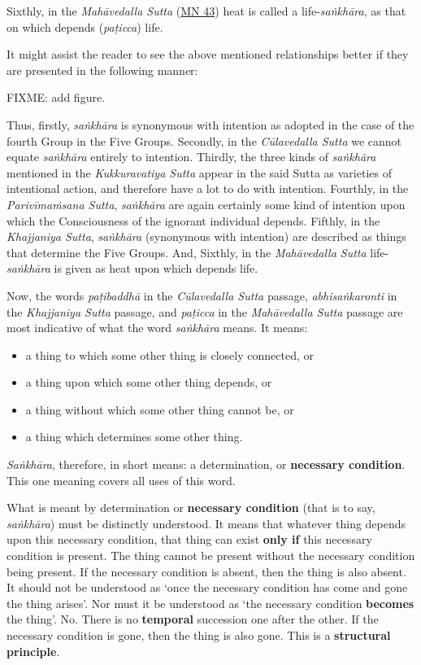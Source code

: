 Sixthly, in the \emph{Mahāvedalla Sutta} (\href{https://suttacentral.net/mn43/en/sujato}{MN 43}) heat is called a life-\emph{saṅkhāra}, as that on which depends (\emph{paṭicca}) life.

It might assist the reader to see the above mentioned relationships better if they are presented in the following manner:

FIXME: add figure.

Thus, firstly, \emph{saṅkhāra} is synonymous with intention as adopted in the case of the fourth Group in the Five Groups. Secondly, in the \emph{Cūlavedalla Sutta} we cannot equate \emph{saṅkhāra} entirely to intention. Thirdly, the three kinds of \emph{saṅkhāra} mentioned in the \emph{Kukkuravatiya Sutta} appear in the said Sutta as varieties of intentional action, and therefore have a lot to do with intention. Fourthly, in the \emph{Parivīmaṁsana Sutta}, \emph{saṅkhāra} are again certainly some kind of intention upon which the Consciousness of the ignorant individual depends. Fifthly, in the \emph{Khajjaniya Sutta}, \emph{saṅkhāra} (synonymous with intention) are described as things that determine the Five Groups. And, Sixthly, in the \emph{Mahāvedalla Sutta} life-\emph{saṅkhāra} is given as heat upon which depends life.

Now, the words \emph{paṭibaddhā} in the \emph{Cūlavedalla Sutta} passage, \emph{abhisaṅkaronti} in the \emph{Khajjaniya Sutta} passage, and \emph{paṭicca} in the \emph{Mahāvedalla Sutta} passage are most indicative of what the word \emph{saṅkhāra} means. It means:

\begin{itemize}
\item
  a thing to which some other thing is closely connected, or
\item
  a thing upon which some other thing depends, or
\item
  a thing without which some other thing cannot be, or
\item
  a thing which determines some other thing.
\end{itemize}

\emph{Saṅkhāra}, therefore, in short means: a determination, or \textbf{necessary condition}. This one meaning covers all uses of this word.

What is meant by determination or \textbf{necessary condition} (that is to say, \emph{saṅkhāra}) must be distinctly understood. It means that whatever thing depends upon this necessary condition, that thing can exist \textbf{only if} this necessary condition is present. The thing cannot be present without the necessary condition being present. If the necessary condition is absent, then the thing is also absent. It should not be understood as `once the necessary condition has come and gone the thing arises'. Nor must it be understood as `the necessary condition \textbf{becomes} the thing'. No. There is no \textbf{temporal} succession one after the other. If the necessary condition is gone, then the thing is also gone. This is a \textbf{structural principle}.

